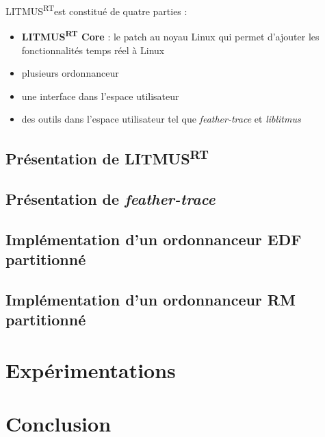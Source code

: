 \documentclass[11pt]{article}
\newcommand{\litmus}{LITMUS\textsuperscript{RT}}
\begin{document}
    \litmus est constitué de quatre parties : 
    \begin{itemize}
        \item \textbf{LITMUS\textsuperscript{RT} Core} : le patch au noyau Linux qui permet d'ajouter les fonctionnalités temps réel à Linux
        \item plusieurs \gls{ordonnanceur}
        \item une interface dans l'espace utilisateur
        \item des outils dans l'espace utilisateur tel que \textit{feather-trace} et \textit{liblitmus}
    \end{itemize}


    \subsection{Présentation de \litmus}
    
    
    
    \subsection{Présentation de \textit{feather-trace}}
    


    \subsection{Implémentation d'un ordonnanceur EDF partitionné}
    
    
    
    \subsection{Implémentation d'un ordonnanceur RM partitionné}

    
    
    
    \newpage
    \section{Expérimentations}

    


    \newpage
    \section{Conclusion}
\end{document}
